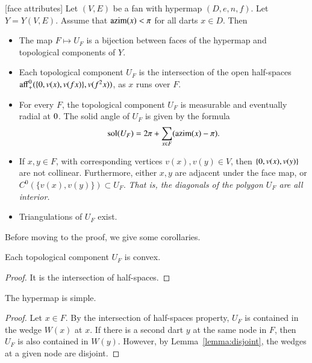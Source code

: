 {\begin{lemma}[face attributes]\label{lemma:face}
Let $(V,E)$ be a fan with hypermap $(D,e,n,f)$. 
Let $Y=Y(V,E)$.
Assume that ${\operatorname{azim}}(x)<\pi$
for all darts $x\in D$.  Then
\begin{itemize}
\item The map $F\mapsto U_F$ is a bijection between faces of the hypermap
and topological components of $Y$.
\item  Each topological component $U_F$ is the intersection of the open
half-spaces ${\operatorname{aff}}_+^0(\{0,v(x),v({f x})\},v(f^2 x))$, as $x$ runs
over $F$.
\item For every $F$, the topological component $U_F$ is measurable and
eventually radial at $0$.  The solid angle of $U_F$ is given by the
formula
$$
\operatorname{sol}(U_F) = 2\pi + \sum_{x\in F}({\operatorname{azim}}(x)-\pi).
$$
\item If $x,y\in F$, with corresponding vertices $v(x),v(y)\in V$, then
$\{0,v(x),v(y)\}$ are not collinear.
Furthermore, 
either $x,y$ are adjacent under the face map, or $C^0(\{v(x),v(y)\})\subset U_F$.  {\it That is, the diagonals of the polygon $U_F$ are all interior.}
\item  Triangulations of $U_F$ exist.
\end{itemize}
\end{lemma}

Before moving to the proof, we give some corollaries.

\begin{corollary}
Each topological component $U_F$ is convex.
\end{corollary}

\begin{proof} It is the intersection of half-spaces.
\end{proof}

\begin{corollary}  
The hypermap is simple.
\end{corollary}

\begin{proof}  Let $x\in F$.  By the intersection of half-spaces property, $U_F$ is contained in the wedge $W(x)$ at $x$.  If there is a second dart $y$ at the same node in $F$, then $U_F$ is also contained in $W(y)$. However, by Lemma~\ref{lemma:disjoint}, the wedges at a given node are disjoint.
\end{proof}

}

